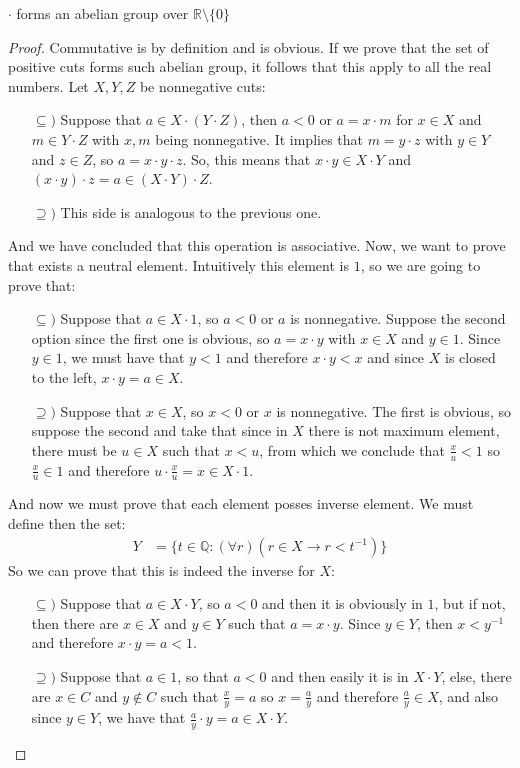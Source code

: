 \documentclass{tufte-handout}
\begin{document}
\begin{theorem}
	$\cdot$ forms an abelian group over $\mathbb{R} \setminus \{0\}$
\end{theorem}
\begin{proof}
	Commutative is by definition and is obvious. If we prove that the set of positive cuts forms such abelian group, it follows that this apply to all the real numbers. Let $X, Y, Z$ be nonnegative cuts:
	\begin{itemize}
		\item[$\subseteq)$] Suppose that $a \in X \cdot (Y \cdot Z)$, then $a < 0$ or $a = x \cdot m$ for $x \in X$ and $m \in Y \cdot Z$ with $x, m$ being nonnegative. It implies that $m = y \cdot z$ with $y \in Y$ and $z \in Z$, so $a = x \cdot y \cdot z$. So, this means that $x \cdot y \in X \cdot Y$ and $(x \cdot y) \cdot z = a \in (X \cdot Y) \cdot Z$.
		\item[$\supseteq)$] This side is analogous to the previous one.
	\end{itemize}
	And we have concluded that this operation is associative. Now, we want to prove that exists a neutral element. Intuitively this element is $1$, so we are going to prove that:
	\begin{itemize}
		\item[$\subseteq)$] Suppose that $a \in X \cdot 1$, so $a < 0$ or $a$ is nonnegative. Suppose the second option since the first one is obvious, so $a = x \cdot y$ with $x \in X$ and $y \in 1$. Since $y \in 1$, we must have that $y < 1$ and therefore $x \cdot y < x$ and since $X$ is closed to the left, $x \cdot y = a \in X$.
		\item[$\supseteq)$] Suppose that $x \in X$, so $x < 0$ or $x$ is nonnegative. The first is obvious, so suppose the second and take that since in $X$ there is not maximum element, there must be $u \in X$ such that $x < u$, from which we conclude that $\frac{x}{u} < 1$ so $\frac{x}{u} \in 1$ and therefore $u \cdot \frac{x}{u} = x \in X \cdot 1$. 
	\end{itemize}

	And now we must prove that each element posses inverse element. We must define then the set:
	\begin{align*}
		Y &= \{t \in \mathbb{Q}: (\forall r)(r \in X \rightarrow r < t^{-1})\}
	\end{align*}
	So we can prove that this is indeed the inverse for $X$:
	\begin{itemize}
		\item[$\subseteq)$] Suppose that $a \in X \cdot Y$, so $a < 0$ and then it is obviously in $1$, but if not, then there are $x \in X$ and $y \in Y$ such that $a = x \cdot y$. Since $y \in Y$, then $x < y^{-1}$ and therefore $x\cdot y = a < 1$.
		\item[$\supseteq)$] Suppose that $a \in 1$, so that $a < 0$ and then easily it is in $X \cdot Y$, else, there are $x \in C$ and $y \not\in C$ such that $\frac{x}{y} = a$ so $x = \frac{a}{y}$ and therefore $\frac{a}{y} \in X$, and also since $y \in Y$, we have that $\frac{a}{y} \cdot y = a \in X \cdot Y$.  
	\end{itemize}
\end{proof}
\end{document}
